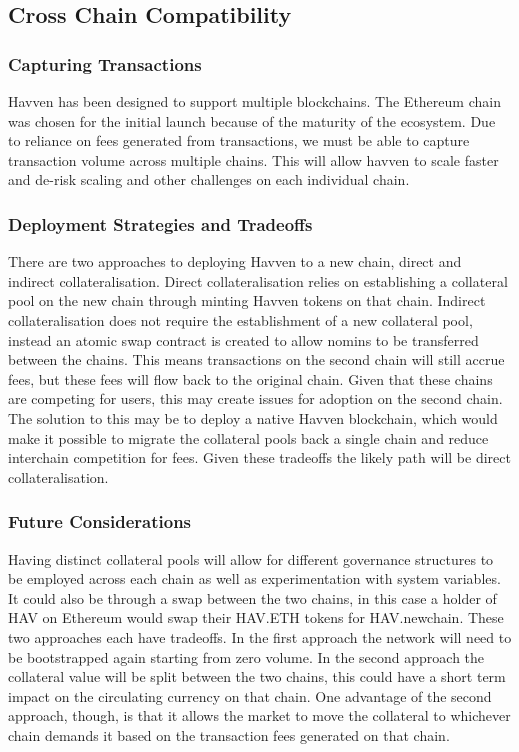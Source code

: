 \subsection{Cross Chain Compatibility}

\subsubsection{Capturing Transactions}

\noindent Havven has been designed to support multiple blockchains. The Ethereum
chain was chosen for the initial launch because of the maturity of the ecosystem.
Due to reliance on fees generated from transactions, we must be able to capture
transaction volume across multiple chains. This will allow havven to scale 
faster and de-risk scaling and other challenges on each individual chain. \\

\subsubsection{Deployment Strategies and Tradeoffs}

\noindent There are two approaches to deploying Havven to a new chain, direct
and indirect collateralisation. Direct collateralisation relies on establishing a
collateral pool on the new chain through minting Havven tokens on that chain. 
Indirect collateralisation does not require the establishment of a new collateral 
pool, instead an atomic swap contract is created to allow nomins to be transferred 
between the chains. This means transactions on the second chain will still accrue 
fees, but these fees will flow back to the original chain. Given that these chains
are competing for users, this may create issues for adoption on the second chain. 
The solution to this may be to deploy a native Havven blockchain, which would make 
it possible to migrate the collateral pools back a single chain and reduce 
interchain competition for fees. Given these tradeoffs the likely path will be 
direct collateralisation.\\

\subsubsection{Future Considerations}

\noindent Having distinct collateral pools will allow for different governance 
structures to be employed across each chain as well as experimentation with system 
variables.\\

\noindent It could also be through a swap between the two chains, in this case a 
holder of HAV on Ethereum would swap their HAV.ETH tokens for HAV.newchain. These 
two approaches each have tradeoffs. In the first approach the network will need to 
be bootstrapped again starting from zero volume. In the second approach the collateral 
value will be split between the two chains, this could have a short term impact on 
the circulating currency on that chain. One advantage of the second approach, though, 
is that it allows the market to move the collateral to whichever chain demands it 
based on the transaction fees generated on that chain.\\
